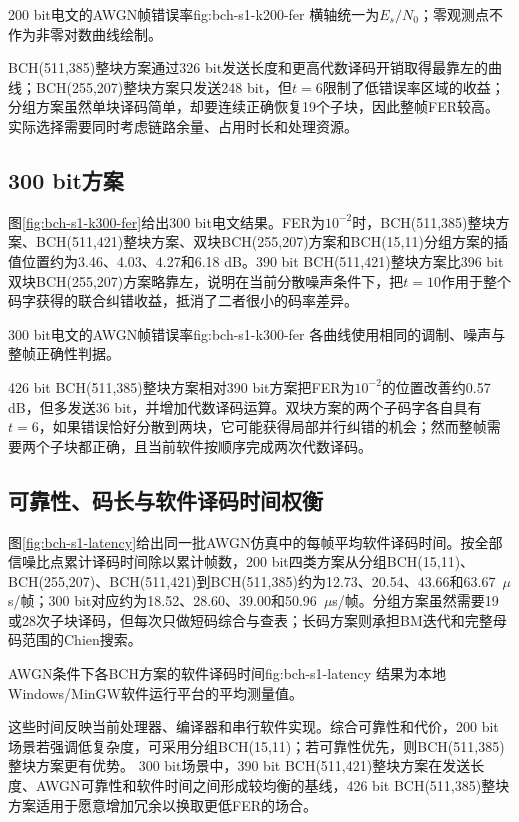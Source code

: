   {200 bit电文的AWGN帧错误率}{fig:bch-s1-k200-fer}
  {横轴统一为$E_s/N_0$；零观测点不作为非零对数曲线绘制。}

BCH(511,385)整块方案通过326 bit发送长度和更高代数译码开销取得最靠左的曲线；BCH(255,207)整块方案只发送248 bit，但$t=6$限制了低错误率区域的收益；分组方案虽然单块译码简单，却要连续正确恢复19个子块，因此整帧FER较高。实际选择需要同时考虑链路余量、占用时长和处理资源。

\subsection{300 bit方案}

图\ref{fig:bch-s1-k300-fer}给出300 bit电文结果。FER为$10^{-2}$时，BCH(511,385)整块方案、BCH(511,421)整块方案、双块BCH(255,207)方案和BCH(15,11)分组方案的插值位置约为3.46、4.03、4.27和6.18 dB。390 bit BCH(511,421)整块方案比396 bit双块BCH(255,207)方案略靠左，说明在当前分散噪声条件下，把$t=10$作用于整个码字获得的联合纠错收益，抵消了二者很小的码率差异。

  {300 bit电文的AWGN帧错误率}{fig:bch-s1-k300-fer}
  {各曲线使用相同的调制、噪声与整帧正确性判据。}

426 bit BCH(511,385)整块方案相对390 bit方案把FER为$10^{-2}$的位置改善约0.57 dB，但多发送36 bit，并增加代数译码运算。双块方案的两个子码字各自具有$t=6$，如果错误恰好分散到两块，它可能获得局部并行纠错的机会；然而整帧需要两个子块都正确，且当前软件按顺序完成两次代数译码。

\subsection{可靠性、码长与软件译码时间权衡}

图\ref{fig:bch-s1-latency}给出同一批AWGN仿真中的每帧平均软件译码时间。按全部信噪比点累计译码时间除以累计帧数，200 bit四类方案从分组BCH(15,11)、BCH(255,207)、BCH(511,421)到BCH(511,385)约为12.73、20.54、43.66和63.67~$\mu$s/帧；300 bit对应约为18.52、28.60、39.00和50.96~$\mu$s/帧。分组方案虽然需要19或28次子块译码，但每次只做短码综合与查表；长码方案则承担BM迭代和完整母码范围的Chien搜索。

  {AWGN条件下各BCH方案的软件译码时间}{fig:bch-s1-latency}
  {结果为本地Windows/MinGW软件运行平台的平均测量值。}

这些时间反映当前处理器、编译器和串行软件实现。综合可靠性和代价，200 bit场景若强调低复杂度，可采用分组BCH(15,11)；若可靠性优先，则BCH(511,385)整块方案更有优势。
300 bit场景中，390 bit BCH(511,421)整块方案在发送长度、AWGN可靠性和软件时间之间形成较均衡的基线，426 bit BCH(511,385)整块方案适用于愿意增加冗余以换取更低FER的场合。

